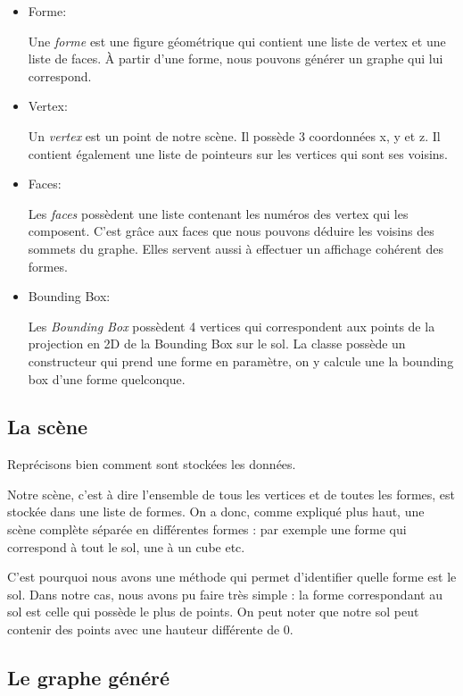 \documentclass[a4paper,12pt]{report}
\begin{document}
\begin{itemize}
 \item Forme:

Une \textit{forme} est une figure géométrique qui contient une liste de vertex et une liste de faces. À partir d'une forme, nous pouvons générer un graphe qui lui correspond.
 
 \item Vertex:

Un \textit{vertex} est un point de notre scène. Il possède 3 coordonnées x, y et z. Il contient également une liste de pointeurs sur les vertices qui sont ses voisins.

 \item Faces:

Les \textit{faces} possèdent une liste contenant les numéros des vertex qui les composent. C'est grâce aux faces que nous pouvons déduire les voisins des sommets du graphe. Elles servent aussi à effectuer un affichage cohérent des formes.

 \item Bounding Box:

Les \textit{Bounding Box} possèdent 4 vertices qui correspondent aux points de la projection en 2D de la Bounding Box sur le sol. La classe possède un constructeur qui prend une forme en paramètre, on y calcule une la bounding box d'une forme quelconque.

\end{itemize}


\subsection{La scène}

Reprécisons bien comment sont stockées les données.

Notre scène, c'est à dire l'ensemble de tous les vertices et de toutes les formes, est stockée dans une liste de formes. On a donc, comme expliqué plus haut, une scène complète séparée en différentes formes : par exemple une forme qui correspond à tout le sol, une à un cube etc.

C'est pourquoi nous avons une méthode qui permet d'identifier quelle forme est le sol. Dans notre cas, nous avons pu faire très simple : la forme correspondant au sol est celle qui possède le plus de points. On peut noter que notre sol peut contenir des points avec une hauteur différente de 0.

\subsection{Le graphe généré}
\end{document}
